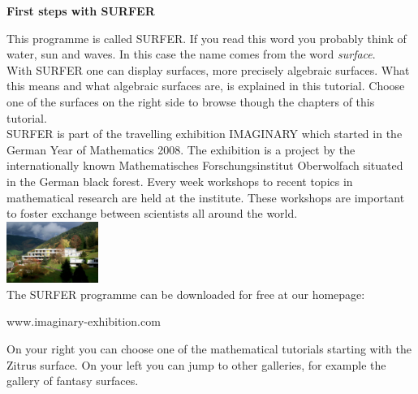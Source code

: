 \documentclass[sans]{amsart}
\newlength{\galIntroHeight}
\newlength{\galIntroWidth}
\newenvironment{surferGalIntroPage}{%
  \newpage
  \special{papersize=\galIntroHeight,\galIntroWidth}
  \pagecolor{textHgColor}
  \color{textFgColor}
  \thispagestyle{empty}
  \begin{flushleft}}%
  {\end{flushleft}}
\newenvironment{galTitle}{\bf}{

}
\newenvironment{surferText}{}{}
\begin{document}
\footnotesize
\begin{surferGalIntroPage}
  \begin{galTitle}First steps with SURFER\end{galTitle}
  \begin{surferText}
This programme is called SURFER. If you read this word you probably think of water, sun and waves. In this case the name comes from the word {\it surface}.
\\
With SURFER one can display surfaces, more precisely algebraic surfaces. What this means and what algebraic surfaces are, is explained in this tutorial. Choose one of the surfaces on the right side to browse though the chapters of this tutorial.\\
SURFER is part of the travelling exhibition IMAGINARY which started in the German Year of Mathematics 2008. The exhibition is a project by the internationally known Mathematisches Forschungsinstitut Oberwolfach situated in the German black forest. Every week workshops to recent topics in mathematical research are held at the institute. These workshops are important to foster exchange between scientists all around the world. \\
\vspace{0.2cm} \hspace{3.5cm}\includegraphics[width=3cm]{./../../common/images/photo_mfo.jpg}\\
The SURFER programme can be downloaded for free at our homepage: \\
\begin{centering}
www.imaginary-exhibition.com\\
\end{centering}
 \vspace{0.2cm}
On your right you can choose one of the mathematical tutorials starting with the Zitrus surface. On your left you can jump to other galleries, for example the gallery of fantasy surfaces.
   
     \end{surferText}
\end{surferGalIntroPage}
\end{document}
